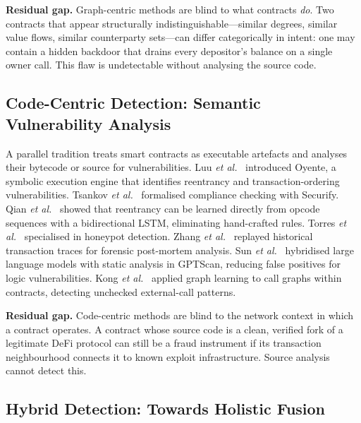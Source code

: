 \textbf{Residual gap.}
Graph-centric methods are blind to what contracts \emph{do}.
Two contracts that appear structurally indistinguishable---similar
degrees, similar value flows, similar counterparty sets---can differ
categorically in intent: one may contain a hidden backdoor that drains
every depositor's balance on a single owner call.
This flaw is undetectable without analysing the source code.

\subsection{Code-Centric Detection: Semantic Vulnerability Analysis}

A parallel tradition treats smart contracts as executable artefacts and
analyses their bytecode or source for vulnerabilities.
Luu \emph{et al.}~\cite{luu2016oyente} introduced Oyente, a symbolic
execution engine that identifies reentrancy and transaction-ordering
vulnerabilities.  Tsankov \emph{et al.}~\cite{tsankov2018securify}
formalised compliance checking with Securify.  Qian \emph{et
al.}~\cite{qian2020reentrancy} showed that reentrancy can be learned
directly from opcode sequences with a bidirectional LSTM, eliminating
hand-crafted rules.  Torres \emph{et al.}~\cite{torres2019honeypots}
specialised in honeypot detection.  Zhang \emph{et
al.}~\cite{zhang2020txspector} replayed historical transaction traces
for forensic post-mortem analysis.  Sun \emph{et
al.}~\cite{sun2024gptscan} hybridised large language models with static
analysis in GPTScan, reducing false positives for logic vulnerabilities.
Kong \emph{et al.}~\cite{kong2025uechecker} applied graph learning to
call graphs within contracts, detecting unchecked external-call patterns.

\textbf{Residual gap.}
Code-centric methods are blind to the network context in which a
contract operates.  A contract whose source code is a clean, verified
fork of a legitimate DeFi protocol can still be a fraud instrument if
its transaction neighbourhood connects it to known exploit infrastructure.
Source analysis cannot detect this.

\subsection{Hybrid Detection: Towards Holistic Fusion}

